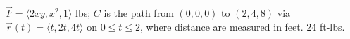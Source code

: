 {$\vec F = \langle 2xy,x^2,1\rangle$ lbs; $C$ is the path from $(0,0,0)$ to $(2,4,8)$ via $\vec r(t) = \langle t,2t, 4t\rangle$ on $0\leq t\leq 2$, where distance are measured in feet.
}
{$24$ ft-lbs. %
}
